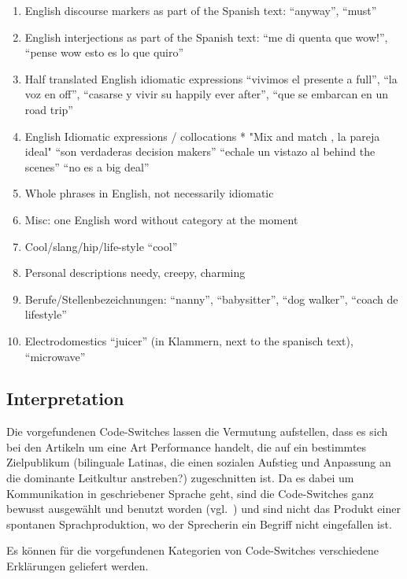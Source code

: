 \begin{enumerate}
  \item English discourse markers as part of the Spanish text:
      ``anyway'', ``must''
  \item English interjections as part of the Spanish text:
      ``me di quenta que wow!'', ``pense wow esto es lo que quiro''
  \item Half translated English idiomatic expressions
      ``vivimos el presente a full'', ``la voz en off'', ``casarse y vivir su happily ever after'', ``que se embarcan en un road trip''
  \item English Idiomatic expressions / collocations
    * "Mix and match , la pareja ideal"
        ``son verdaderas decision makers''
        ``echale un vistazo al behind the scenes''
        ``no es a big deal''
  \item Whole phrases in English, not necessarily idiomatic %


  \item Misc: one English word without category at the moment
  \item Cool/slang/hip/life-style
      ``cool''
  \item Personal descriptions
      needy, creepy, charming
  \item Berufe/Stellenbezeichnungen: ``nanny'', ``babysitter'', ``dog walker'', ``coach de lifestyle''
  \item Electrodomestics
      ``juicer'' (in Klammern, next to the spanisch text), ``microwave''
\end{enumerate}

\subsection{Interpretation}
\label{chap:results-analysis}

Die vorgefundenen Code-Switches lassen die Vermutung aufstellen, dass es sich bei den Artikeln um eine Art Performance handelt, die auf ein bestimmtes Zielpublikum (bilinguale Latinas, die einen sozialen Aufstieg und Anpassung an die dominante Leitkultur anstreben?) zugeschnitten ist.
Da es dabei um Kommunikation in geschriebener Sprache geht, sind die Code-Switches ganz bewusst ausgewählt und benutzt worden (vgl.~\cite{Mahootian05}) und sind nicht das Produkt einer spontanen Sprachproduktion, wo der Sprecherin ein Begriff nicht eingefallen ist.

Es können für die vorgefundenen Kategorien von Code-Switches verschiedene Erklärungen geliefert werden.

